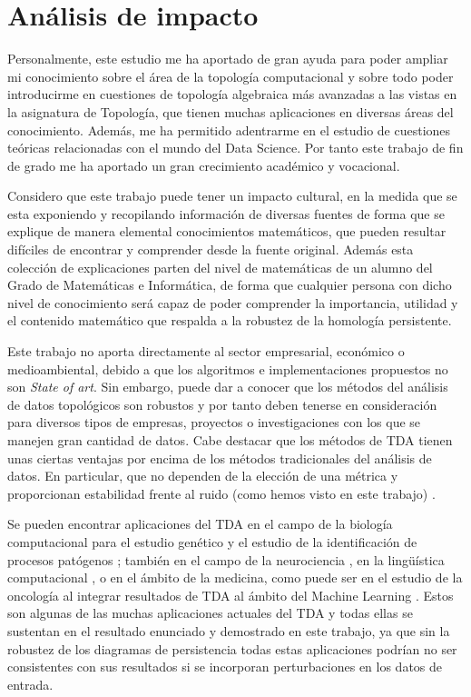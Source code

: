 \chapter{Análisis de impacto}

Personalmente, este estudio me ha aportado de gran ayuda para poder ampliar mi conocimiento sobre el área de la topología computacional y sobre todo poder introducirme en cuestiones de topología algebraica más avanzadas a las vistas en la asignatura de Topología, que tienen muchas aplicaciones en diversas áreas del conocimiento. Además, me ha permitido adentrarme en el estudio de cuestiones teóricas relacionadas con el mundo del Data Science. Por tanto este trabajo de fin de grado me ha aportado un gran crecimiento académico y vocacional.

Considero que este trabajo puede tener un impacto cultural, en la medida que se esta exponiendo y recopilando información de diversas fuentes de forma que se explique de manera elemental conocimientos matemáticos, que pueden resultar difíciles de encontrar y comprender desde la fuente original. Además esta colección de explicaciones parten del nivel de matemáticas de un alumno del Grado de Matemáticas e Informática, de forma que cualquier persona con dicho nivel de conocimiento será capaz de poder comprender la importancia, utilidad y el contenido matemático que respalda a la robustez de la homología persistente.

Este trabajo no aporta directamente al sector empresarial, económico o medioambiental, debido a que los algoritmos e implementaciones propuestos no son \emph{State of art}. Sin embargo, puede dar a conocer que los métodos del análisis de datos topológicos son robustos y por tanto deben tenerse en consideración para diversos tipos de empresas, proyectos o investigaciones con los que se manejen gran cantidad de datos. Cabe destacar que los métodos de TDA tienen unas ciertas ventajas por encima de los métodos tradicionales del análisis de datos. En particular, que no dependen de la elección de una métrica y proporcionan estabilidad frente al ruido (como hemos visto en este trabajo) \cite{tdaIBM}.  

Se pueden encontrar aplicaciones del TDA en el campo de la biología computacional para el estudio genético y el estudio de la identificación de procesos patógenos \cite{biologia}; también en el campo de la neurociencia \cite{neuronas}, en la lingüística computacional \cite{linguistica}, o en el ámbito de la medicina, como puede ser en el estudio de la oncología al integrar resultados de TDA al ámbito del Machine Learning \cite{oncologia}. Estos son algunas de las muchas aplicaciones actuales del TDA y todas ellas se sustentan en el resultado enunciado y demostrado en este trabajo, ya que sin la robustez de los diagramas de persistencia todas estas aplicaciones podrían no ser consistentes con sus resultados si se incorporan perturbaciones en los datos de entrada.